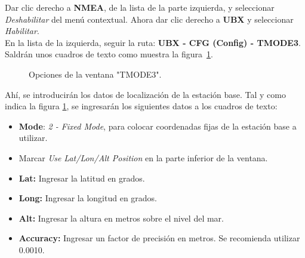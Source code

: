 Dar clic derecho a \textbf{NMEA}, de la lista de la parte izquierda, y seleccionar \textit{Deshabilitar} del menú contextual. Ahora dar clic derecho a \textbf{UBX} y seleccionar \textit{Habilitar}.\\

En la lista de la izquierda, seguir la ruta: \textbf{UBX - CFG (Config) - TMODE3}. Saldrán unos cuadros de texto como muestra la figura~\ref{fig:TMode3Base}.

\begin{figure}[H] %
\caption{Opciones de la ventana "TMODE3".}
\label{fig:TMode3Base}
\end{figure}

Ahí, se introducirán los datos de localización de la estación base. Tal y como indica la figura \ref{fig:TMode3Base}, se ingresarán los siguientes datos a los cuadros de texto:

\begin{itemize}
\item \textbf{Mode}: \textit{2 - Fixed Mode}, para colocar coordenadas fijas de la estación base a utilizar.

\item Marcar \textit{Use Lat/Lon/Alt Position} en la parte inferior de la ventana.

\item \textbf{Lat:} Ingresar la latitud en grados.

\item \textbf{Long:} Ingresar la longitud en grados.

\item \textbf{Alt:} Ingresar la altura en metros sobre el nivel del mar.

\item \textbf{Accuracy:} Ingresar un factor de precisión en metros. Se recomienda utilizar 0.0010.
\end{itemize}

